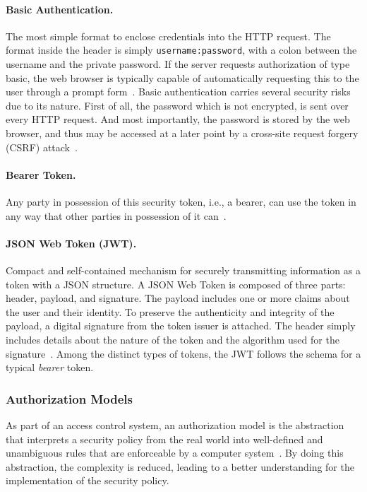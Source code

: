 \documentclass[12pt]{article}
\begin{document}
\paragraph{Basic Authentication.} The most simple format to enclose credentials into the HTTP request. The format inside the header is simply \texttt{username:password}, with a colon between the username and the private password. If the server requests authorization of type basic, the web browser is typically capable of automatically requesting this to the user through a prompt form~\cite{RFC7617}. Basic authentication carries several security risks due to its nature. First of all, the password which is not encrypted, is sent over every HTTP request. And most importantly, the password is stored by the web browser, and thus may be accessed at a later point by a cross-site request forgery (CSRF) attack~\cite{basic_01}.

\paragraph{Bearer Token.} Any party in possession of this security token, i.e., a bearer, can use the token in any way that other parties in possession of it can~\cite{RFC6750}.

\paragraph{JSON Web Token (JWT).} Compact and self-contained mechanism for securely transmitting information as a token with a JSON structure. A JSON Web Token is composed of three parts: header, payload, and signature. The payload includes one or more claims about the user and their identity. To preserve the authenticity and integrity of the payload, a digital signature from the token issuer is attached. The header simply includes details about the nature of the token and the algorithm used for the signature~\cite{RFC7519}. Among the distinct types of tokens, the JWT follows the schema for a typical \emph{bearer} token. 

\subsubsection{Authorization Models}

As part of an access control system, an authorization model is the abstraction that interprets a security policy from the real world into well-defined and unambiguous rules that are enforceable by a computer system~\cite{access_01}. By doing this abstraction, the complexity is reduced, leading to a better understanding for the implementation of the security policy. 
\end{document}
